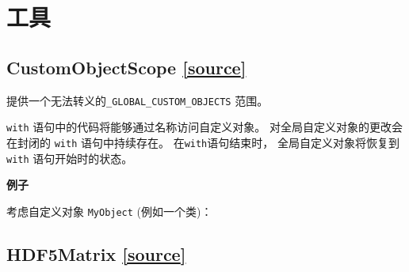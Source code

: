 \section{工具}


\subsection{ CustomObjectScope {\href{https://github.com/keras-team/keras/blob/master/keras/utils/generic_utils.py\#L20}{{[}source{]}}}}\label{customobjectscope}

\begin{Shaded}
\begin{Highlighting}[]
\end{Highlighting}
\end{Shaded}

提供一个无法转义的\texttt{\_GLOBAL\_CUSTOM\_OBJECTS} 范围。

\texttt{with} 语句中的代码将能够通过名称访问自定义对象。
对全局自定义对象的更改会在封闭的 \texttt{with} 语句中持续存在。
在\texttt{with}语句结束时， 全局自定义对象将恢复到 \texttt{with}
语句开始时的状态。

\textbf{例子}

考虑自定义对象 \texttt{MyObject} (例如一个类)：

\begin{Shaded}
\begin{Highlighting}[]
 
    \OperatorTok{=} \OperatorTok{=}\NormalTok{)}
\end{Highlighting}
\end{Shaded}




\subsection{ HDF5Matrix {\href{https://github.com/keras-team/keras/blob/master/keras/utils/io_utils.py\#L16}{{[}source{]}}}}\label{HDF5Matrix}

\begin{Shaded}
\begin{Highlighting}[]
\OperatorTok{=}\OperatorTok{=}\OperatorTok{=}\NormalTok{)}
\end{Highlighting}
\end{Shaded}

